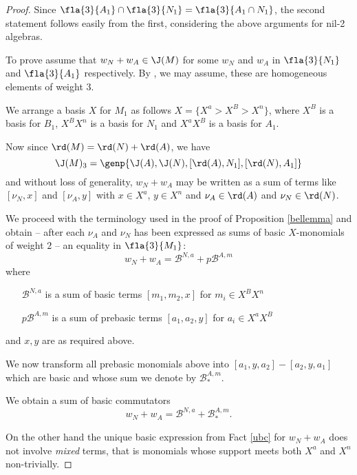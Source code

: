 \begin{proof}
Since $\fla{3}{A_{1}}\cap\fla{3}{N_{1}}=\fla{3}{A_{1}\cap N_{1}}$, the second statement follows easily from the first,
considering the above arguments for nil-2 algebras.

\smallskip
To prove  assume that $w_{N}+w_{A}\in\J(M)$ for some $w_{N}$ and $w_{A}$ in $\fla{3}{N_{1}}$ and $\fla{3}{A_{1}}$
respectively. By , we may assume, these are homogeneous elements of weight $3$.

We arrange a basis $X$ for $M_{1}$ as follows $X=\{X^{a}>X^{B}>X^{n}\}$, where
$X^{B}$ is a basis for $B_{1}$, $X^{B}X^{n}$ is a basis for $N_{1}$ and $X^{a}X^{B}$ is a basis for $A_{1}$.

Now since $\rd(M)=\rd(N)+\rd(A)$, we have
$$\J(M)_{3}=\genp{\J(A),\J(N),[\rd(A),N_{1}],[\rd(N),A_{1}]}$$
and without loss of generality, $w_{N}+w_{A}$ may be written as a sum of terms like $[\nu_{N},x]$ and
$[\nu_{A},y]$ with $x\in X^{a}$, $y\in X^{n}$ and $\nu_{A}\in \rd(A)$ and $\nu_{N}\in \rd(N)$.

We proceed with the terminology used in the proof of Proposition \ref{bellemma} and obtain -- after
each $\nu_{A}$ and $\nu_{N}$ has been expressed as sums of basic $X$-monomials of weight $2$ -- an equality in $\fla{3}{M_{1}}$:
$$w_{N}+w_{A}=\mathcal{B}^{N,a}+p\mathcal{B}^{A,m}$$
where 
\begin{itemize}
\item[$\mathcal{B}^{N,a}$] is a sum of basic terms $[m_{1},m_{2},x]$ for $m_{i}\in X^{B}X^{n}$
\item[$p\mathcal{B}^{A,m}$]is a sum of prebasic terms $[a_{1},a_{2},y]$ for $a_{i}\in X^{a}X^{B}$
\end{itemize}
and $x,y$ are as required above.

We now transform all prebasic monomials above into $[a_{1},y,a_{2}]-[a_{2},y,a_{1}]$ which are basic
and whose sum we denote by $\mathcal{B}^{A,m}_{*}$.

We obtain a sum of basic commutators
$$w_{N}+w_{A}=\mathcal{B}^{N,a}+
\mathcal{B}^{A,m}_{*}.$$

On the other hand the unique basic expression from Fact \ref{ubc} for $w_{N}+w_{A}$ does not involve
{\em mixed} terms, that is monomials whose support meets both $X^{a}$ and $X^{n}$ non-trivially.


\end{proof}
